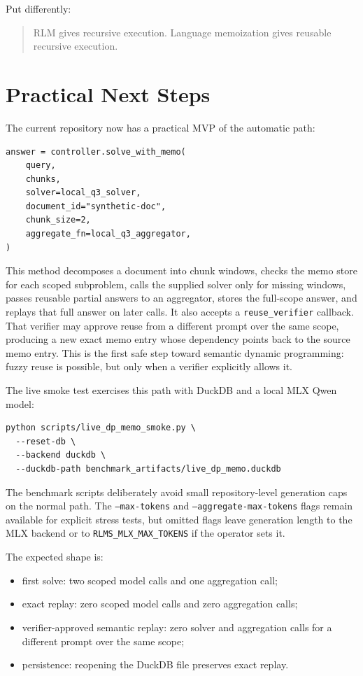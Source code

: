 \documentclass[11pt]{article}
\begin{document}
Put differently:

\begin{quote}
RLM gives recursive execution. Language memoization gives reusable recursive
execution.
\end{quote}

\section{Practical Next Steps}

The current repository now has a practical MVP of the automatic path:

\begin{verbatim}
answer = controller.solve_with_memo(
    query,
    chunks,
    solver=local_q3_solver,
    document_id="synthetic-doc",
    chunk_size=2,
    aggregate_fn=local_q3_aggregator,
)
\end{verbatim}

This method decomposes a document into chunk windows, checks the memo store for
each scoped subproblem, calls the supplied solver only for missing windows,
passes reusable partial answers to an aggregator, stores the full-scope answer,
and replays that full answer on later calls. It also accepts a
\texttt{reuse\_verifier} callback. That verifier may approve reuse from a
different prompt over the same scope, producing a new exact memo entry whose
dependency points back to the source memo entry. This is the first safe step
toward semantic dynamic programming: fuzzy reuse is possible, but only when a
verifier explicitly allows it.

The live smoke test exercises this path with DuckDB and a local MLX Qwen model:

\begin{verbatim}
python scripts/live_dp_memo_smoke.py \
  --reset-db \
  --backend duckdb \
  --duckdb-path benchmark_artifacts/live_dp_memo.duckdb
\end{verbatim}

The benchmark scripts deliberately avoid small repository-level generation caps
on the normal path. The \texttt{--max-tokens} and
\texttt{--aggregate-max-tokens} flags remain available for explicit stress
tests, but omitted flags leave generation length to the MLX backend or to
\texttt{RLMS\_MLX\_MAX\_TOKENS} if the operator sets it.

The expected shape is:

\begin{itemize}[leftmargin=*]
    \item first solve: two scoped model calls and one aggregation call;
    \item exact replay: zero scoped model calls and zero aggregation calls;
    \item verifier-approved semantic replay: zero solver and aggregation calls
    for a different prompt over the same scope;
    \item persistence: reopening the DuckDB file preserves exact replay.
\end{itemize}
\end{document}

